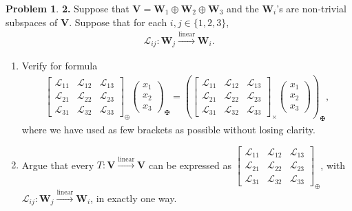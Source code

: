 \documentclass{article}
\theoremstyle{definition}
\newtheorem*{prob*}{Problem}
\newcommand{\V}{\mathbf{V}}
\newcommand{\W}{\mathbf{W}}
\newcommand{\lag}{\mathcal{L}}
\begin{document}
\newpage


\begin{prob*}\textbf{2.} Suppose that $\V = \W_1\oplus \W_2\oplus \W_3$ and the $\W_i$'s are non-trivial subspaces of $\V$. Suppose that for each $i,j \in \{1,2,3 \}$,
	\begin{align*}
	\lag_{ij} : \W_j \overset{\text{linear}}{\longrightarrow} \W_i.
	\end{align*}
	\begin{enumerate}
		\item Verify for formula 
		\begin{align*}
		\begin{bmatrix}
		\lag_{11} & \lag_{12} & \lag_{13}\\
		\lag_{21} & \lag_{22} & \lag_{23}\\
		\lag_{31} & \lag_{32} & \lag_{33}
		\end{bmatrix}_{\oplus} 
		\begin{pmatrix}
		x_1\\x_2\\x_3
		\end{pmatrix}_{\maltese} 
		=
		\left( \begin{bmatrix}
		\lag_{11} & \lag_{12} & \lag_{13}\\
		\lag_{21} & \lag_{22} & \lag_{23}\\
		\lag_{31} & \lag_{32} & \lag_{33}
		\end{bmatrix}_\times \begin{pmatrix}
		x_1\\x_2\\x_3
		\end{pmatrix}   \right)_{\maltese},
		\end{align*}
		where we have used as few brackets as possible without losing clarity.
		
		
		
		\item Argue that every $T : \V \overset{\text{linear}}{\longrightarrow} \V$ can be expressed as $\begin{bmatrix}
		\lag_{11} & \lag_{12} & \lag_{13}\\
		\lag_{21} & \lag_{22} & \lag_{23}\\
		\lag_{31} & \lag_{32} & \lag_{33}
		\end{bmatrix}_\oplus$, with $\lag_{ij} : \W_j \overset{\text{linear}}{\longrightarrow} \W_i$, in exactly one way.
		

\end{enumerate}
\end{prob*}
\end{document}
